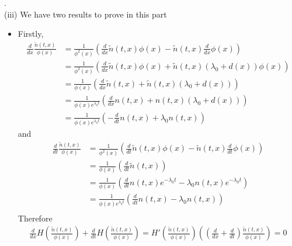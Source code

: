 \documentclass[pdf]{article}
\begin{document}
.\\
\newpage
(iii) We have two results to prove in this part
\begin{itemize} 
\item Firstly,
\begin{align*}
\frac{d}{dx}\frac{\tilde{n}(t,x)}{\phi(x)} &= \frac{1}{\phi^2(x)}\left(\frac{d}{dx}\tilde{n}(t,x)\phi(x) - \tilde{n}(t,x)\frac{d}{dx}\phi(x)\right)\\
                                                                   &= \frac{1}{\phi^2(x)}\left(\frac{d}{dx}\tilde{n}(t,x)\phi(x) + \tilde{n}(t,x)(\lambda_0+d(x))\phi(x)\right)\\
                                                                   &= \frac{1}{\phi(x)}\left(\frac{d}{dx}\tilde{n}(t,x) + \tilde{n}(t,x)(\lambda_0+d(x))\right)\\
                                                                   &= \frac{1}{\phi(x)e^{\lambda_0t}}\left(\frac{d}{dx}n(t,x) + n(t,x)(\lambda_0+d(x))\right)\\
                                                                   &= \frac{1}{\phi(x)e^{\lambda_0t}}\left(-\frac{d}{dt}n(t,x) + \lambda_0n(t,x)\right)
\end{align*}
and
\begin{align*}
\frac{d}{dt}\frac{\tilde{n}(t,x)}{\phi(x)} &= \frac{1}{\phi^2(x)}\left(\frac{d}{dt}\tilde{n}(t,x)\phi(x) - \tilde{n}(t,x)\frac{d}{dt}\phi(x)\right)\\
                                                                   &= \frac{1}{\phi(x)}\left(\frac{d}{dt}\tilde{n}(t,x)\right)\\
                                                                   &= \frac{1}{\phi(x)}\left(\frac{d}{dt}n(t,x)e^{-\lambda_0t} - \lambda_0n(t,x)e^{-\lambda_0t}\right)\\
                                                                   &= \frac{1}{\phi(x)e^{\lambda_0t}}\left(\frac{d}{dt}n(t,x) - \lambda_0n(t,x)\right)\\
\end{align*}
Therefore
\begin{align*}
\frac{d}{dx}H\left(\frac{\tilde{n}(t,x)}{\phi(x)}\right) + \frac{d}{dt}H\left(\frac{\tilde{n}(t,x)}{\phi(x)}\right) = H'\left(\frac{\tilde{n}(t,x)}{\phi(x)}\right)\left((\frac{d}{dx}+\frac{d}{dt})\frac{\tilde{n}(t,x)}{\phi(x)}\right) = 0
\end{align*}


\end{itemize}
\end{document}
